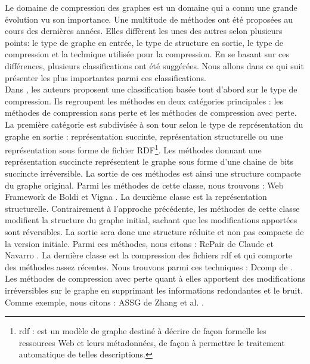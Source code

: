 Le domaine de compression des graphes est un domaine qui a connu une grande évolution vu son importance. Une multitude de méthodes ont été proposées au cours des dernières années. Elles diffèrent les unes des autres selon plusieurs points: le type de graphe en entrée, le type de structure en sortie, le type de compression et la technique utilisée pour la compression. En se basant sur ces différences, plusieurs classifications ont été suggérées. Nous allons dans ce qui suit présenter les plus importantes parmi ces classifications.\\

Dans \citep{maneth2015survey}, les auteurs proposent une classification basée tout d'abord sur le type de compression. Ils regroupent les méthodes en deux catégories principales : les méthodes de compression sans perte et les méthodes de compression avec perte. La première catégorie est subdivisée à son tour selon le type de représentation du graphe en sortie : représentation succinte, représentation structurelle ou une représentation sous forme de fichier RDF\footnote{\gls{rdf} : est un modèle de graphe destiné à décrire de façon formelle les ressources Web et leurs métadonnées, de façon à permettre le traitement automatique de telles descriptions.}. 
Les méthodes donnant une représentation succincte représentent le graphe sous forme d'une chaine de bits succincte irréversible. La sortie de ces méthodes est ainsi une structure compacte du graphe original. Parmi les méthodes de cette classe, nous trouvons : Web Framework de Boldi et Vigna \citep{boldi2004webgraph}. La deuxième classe est la représentation structurelle. Contrairement à l'approche précédente, les méthodes de cette classe modifient la structure du graphe initial, sachant que les modifications apportées sont réversibles. La sortie sera donc une structure réduite et non pas compacte de la version initiale. Parmi ces méthodes, nous citons : RePair de Claude et Navarro \citep{claude2010fast}. La dernière classe est la compression  des fichiers \gls{rdf} et qui comporte des méthodes assez récentes. Nous trouvons parmi ces techniques : Dcomp de \citep{martinez2012compression} . Les méthodes de compression avec perte quant à elles apportent des modifications irréversibles sur le graphe en supprimant les informations redondantes et le bruit. Comme exemple, nous citons : ASSG de Zhang et al. \citep{zhang2014assg}.\\

